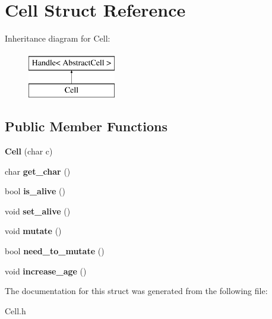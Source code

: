 \hypertarget{structCell}{\section{\-Cell \-Struct \-Reference}
\label{structCell}
}
\-Inheritance diagram for \-Cell\-:\begin{figure}[H]
\begin{center}
\leavevmode
\includegraphics[height=2.000000cm]{structCell}
\end{center}
\end{figure}
\subsection*{\-Public \-Member \-Functions}
\begin{DoxyCompactItemize}
\item 
\hypertarget{structCell_aa4051368a7db39707a9102423c0121d5}{{\bfseries \-Cell} (char c)}\label{structCell_aa4051368a7db39707a9102423c0121d5}

\item 
\hypertarget{structCell_aa0d655b04d26775c14151deba3c112e0}{char {\bfseries get\-\_\-char} ()}\label{structCell_aa0d655b04d26775c14151deba3c112e0}

\item 
\hypertarget{structCell_a6fab71e45c9a5ce38bbc6610c5c6a4e8}{bool {\bfseries is\-\_\-alive} ()}\label{structCell_a6fab71e45c9a5ce38bbc6610c5c6a4e8}

\item 
\hypertarget{structCell_a65dd14cff7944cc293f22983b54bba5c}{void {\bfseries set\-\_\-alive} ()}\label{structCell_a65dd14cff7944cc293f22983b54bba5c}

\item 
\hypertarget{structCell_a87ea2fc58a758ba08cc5fbc684a774d1}{void {\bfseries mutate} ()}\label{structCell_a87ea2fc58a758ba08cc5fbc684a774d1}

\item 
\hypertarget{structCell_a80e93abb26535c200adb00fae3737989}{bool {\bfseries need\-\_\-to\-\_\-mutate} ()}\label{structCell_a80e93abb26535c200adb00fae3737989}

\item 
\hypertarget{structCell_ab92f482d7b092b2bb81f4765dce693bf}{void {\bfseries increase\-\_\-age} ()}\label{structCell_ab92f482d7b092b2bb81f4765dce693bf}

\end{DoxyCompactItemize}


\-The documentation for this struct was generated from the following file\-:\begin{DoxyCompactItemize}
\item 
\-Cell.\-h\end{DoxyCompactItemize}
